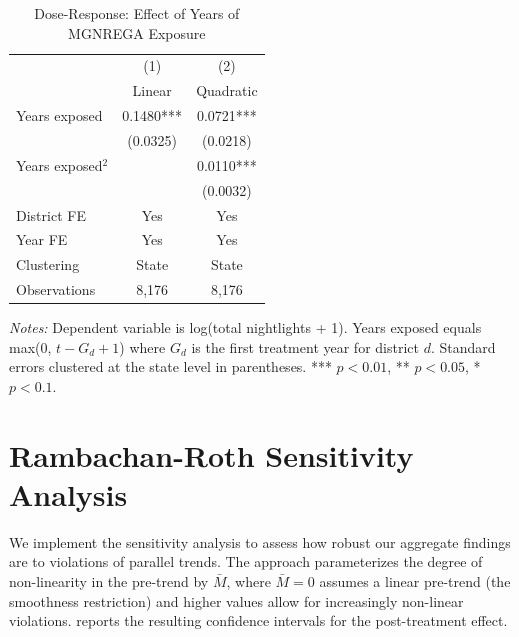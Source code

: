 \documentclass[12pt]{article}
\begin{document}
\begin{table}[htbp]
\centering
\caption{Dose-Response: Effect of Years of MGNREGA Exposure}
\label{tab:dose_response}
\begin{tabular}{lcc}
\hline\hline
 & (1) & (2) \\
 & Linear & Quadratic \\
\hline
Years exposed & 0.1480*** & 0.0721*** \\
 & (0.0325) & (0.0218) \\
Years exposed$^2$ &  & 0.0110*** \\
 &  & (0.0032) \\
\hline
District FE & Yes & Yes \\
Year FE & Yes & Yes \\
Clustering & State & State \\
Observations & 8,176 & 8,176 \\
\hline\hline
\end{tabular}
\begin{tablenotes}[flushleft]\small
\item \textit{Notes:} Dependent variable is log(total nightlights + 1). Years exposed equals max(0, $t - G_d + 1$) where $G_d$ is the first treatment year for district $d$. Standard errors clustered at the state level in parentheses. *** $p<0.01$, ** $p<0.05$, * $p<0.1$.
\end{tablenotes}
\end{table}


\section{Rambachan-Roth Sensitivity Analysis}
\label{app:honestdid}

We implement the \citet{rambachan2023more} sensitivity analysis to assess how robust our aggregate findings are to violations of parallel trends. The approach parameterizes the degree of non-linearity in the pre-trend by $\bar{M}$, where $\bar{M} = 0$ assumes a linear pre-trend (the smoothness restriction) and higher values allow for increasingly non-linear violations.  reports the resulting confidence intervals for the post-treatment effect.
\end{document}
